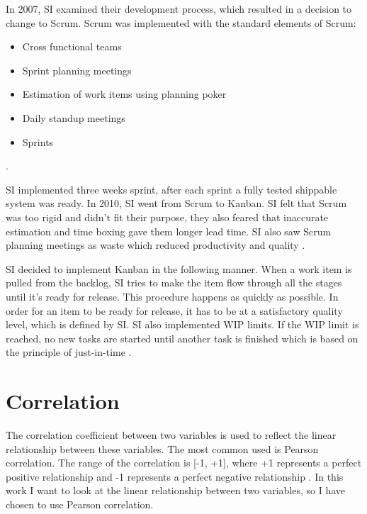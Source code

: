 \documentclass[UKenglish]{ifimaster}  %
\begin{document}
In 2007, SI examined their development process, which resulted in a decision to change to Scrum. Scrum was implemented with the standard elements of Scrum:
\begin{itemize}[noitemsep,topsep=0pt,parsep=0pt,partopsep=0pt]
\item Cross functional teams
\item Sprint planning meetings 
\item Estimation of work items using planning poker
\item Daily standup meetings
\item Sprints
\end{itemize}
\parencite{Dag}. 

SI implemented three weeks sprint, after each sprint a fully tested shippable system was ready. In 2010, SI went from Scrum to Kanban. SI felt that Scrum was too rigid and didn't fit their purpose, they also feared that inaccurate estimation and time boxing gave them longer lead time. SI also saw Scrum planning meetings as waste which reduced productivity and quality \parencite{Dag}. 

SI decided to implement Kanban in the following manner. When a work item is pulled from the backlog, SI tries to make the item flow through all the stages until it's ready for release. This procedure happens as quickly as possible. In order for an item to be ready for release, it has to be at a satisfactory quality level, which is defined by SI. SI also implemented WIP limits. If the WIP limit is reached, no new tasks are started until another task is finished which is based on the principle of just-in-time \parencite{Dag}.

\section{Correlation}
The correlation coefficient between two variables is used to reflect the linear relationship between these variables. The most common used is Pearson correlation.  The range of the correlation is [-1, +1], where +1 represents a perfect positive relationship and -1 represents a perfect negative relationship \parencite{6683402}. In this work I want to look at the linear relationship between two variables, so I have chosen to use Pearson correlation.
\end{document}
